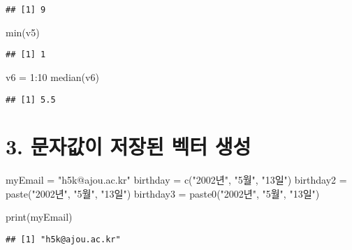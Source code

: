 \documentclass[
]{article}
\newenvironment{Shaded}{\begin{snugshade}}{\end{snugshade}}
\newcommand{\DecValTok}[1]{\textcolor[rgb]{0.00,0.00,0.81}{#1}}
\newcommand{\FunctionTok}[1]{\textcolor[rgb]{0.00,0.00,0.00}{#1}}
\newcommand{\NormalTok}[1]{#1}
\newcommand{\OtherTok}[1]{\textcolor[rgb]{0.56,0.35,0.01}{#1}}
\newcommand{\SpecialCharTok}[1]{\textcolor[rgb]{0.00,0.00,0.00}{#1}}
\newcommand{\StringTok}[1]{\textcolor[rgb]{0.31,0.60,0.02}{#1}}
\begin{document}
\begin{verbatim}
## [1] 9
\end{verbatim}

\begin{Shaded}
\begin{Highlighting}[]
\FunctionTok{min}\NormalTok{(v5)}
\end{Highlighting}
\end{Shaded}

\begin{verbatim}
## [1] 1
\end{verbatim}

\begin{Shaded}
\begin{Highlighting}[]
\NormalTok{v6 }\OtherTok{=} \DecValTok{1}\SpecialCharTok{:}\DecValTok{10}
\FunctionTok{median}\NormalTok{(v6)}
\end{Highlighting}
\end{Shaded}

\begin{verbatim}
## [1] 5.5
\end{verbatim}

\hypertarget{uxbb38uxc790uxac12uxc774-uxc800uxc7a5uxb41c-uxbca1uxd130-uxc0dduxc131}{%
\section{3. 문자값이 저장된 벡터
생성}\label{uxbb38uxc790uxac12uxc774-uxc800uxc7a5uxb41c-uxbca1uxd130-uxc0dduxc131}}

\begin{Shaded}
\begin{Highlighting}[]
\NormalTok{myEmail }\OtherTok{=} \StringTok{"h5k@ajou.ac.kr"}
\NormalTok{birthday }\OtherTok{=} \FunctionTok{c}\NormalTok{(}\StringTok{"2002년"}\NormalTok{, }\StringTok{"5월"}\NormalTok{, }\StringTok{"13일"}\NormalTok{)}
\NormalTok{birthday2 }\OtherTok{=} \FunctionTok{paste}\NormalTok{(}\StringTok{"2002년"}\NormalTok{, }\StringTok{"5월"}\NormalTok{, }\StringTok{"13일"}\NormalTok{)}
\NormalTok{birthday3 }\OtherTok{=} \FunctionTok{paste0}\NormalTok{(}\StringTok{"2002년"}\NormalTok{, }\StringTok{"5월"}\NormalTok{, }\StringTok{"13일"}\NormalTok{)}

\FunctionTok{print}\NormalTok{(myEmail)}
\end{Highlighting}
\end{Shaded}

\begin{verbatim}
## [1] "h5k@ajou.ac.kr"
\end{verbatim}
\end{document}

